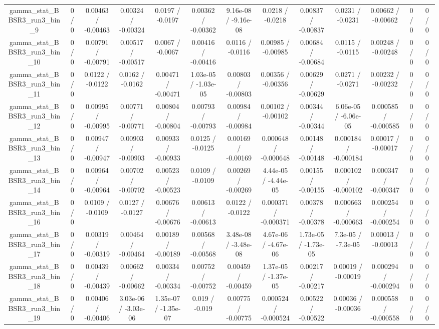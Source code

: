 \documentclass[10pt]{article}
\begin{document}
\begin{table}[htbp]
\begin{center}
\begin{tabular}{|c|c|c|c|c|c|c|c|c|c|c|c|c|}
  gamma_stat_BBSR3_run3_bin_9 & 0 / 0 & 0.00463 / -0.00463 & 0.00324 / -0.00324 & 0.0197 / -0.0197 & 0.00362 / -0.00362 & 9.16e-08 / -9.16e-08 & 0.0218 / -0.0218 & 0.00837 / -0.00837 & 0.0231 / -0.0231 & 0.00662 / -0.00662 & 0 / 0 & 0 / 0 \\ 
  gamma_stat_BBSR3_run3_bin_10 & 0 / 0 & 0.00791 / -0.00791 & 0.00517 / -0.00517 & 0.0067 / -0.0067 & 0.00416 / -0.00416 & 0.0116 / -0.0116 & 0.00985 / -0.00985 & 0.00684 / -0.00684 & 0.0115 / -0.0115 & 0.00248 / -0.00248 & 0 / 0 & 0 / 0 \\ 
  gamma_stat_BBSR3_run3_bin_11 & 0 / 0 & 0.0122 / -0.0122 & 0.0162 / -0.0162 & 0.00471 / -0.00471 & 1.03e-05 / -1.03e-05 & 0.00803 / -0.00803 & 0.00356 / -0.00356 & 0.00629 / -0.00629 & 0.0271 / -0.0271 & 0.00232 / -0.00232 & 0 / 0 & 0 / 0 \\ 
  gamma_stat_BBSR3_run3_bin_12 & 0 / 0 & 0.00995 / -0.00995 & 0.00771 / -0.00771 & 0.00804 / -0.00804 & 0.00793 / -0.00793 & 0.00984 / -0.00984 & 0.00102 / -0.00102 & 0.00344 / -0.00344 & 6.06e-05 / -6.06e-05 & 0.000585 / -0.000585 & 0 / 0 & 0 / 0 \\ 
  gamma_stat_BBSR3_run3_bin_13 & 0 / 0 & 0.00947 / -0.00947 & 0.00903 / -0.00903 & 0.00933 / -0.00933 & 0.0125 / -0.0125 & 0.00169 / -0.00169 & 0.000648 / -0.000648 & 0.00148 / -0.00148 & 0.000184 / -0.000184 & 0.00017 / -0.00017 & 0 / 0 & 0 / 0 \\ 
  gamma_stat_BBSR3_run3_bin_14 & 0 / 0 & 0.00964 / -0.00964 & 0.00702 / -0.00702 & 0.00523 / -0.00523 & 0.0109 / -0.0109 & 0.00269 / -0.00269 & 4.44e-05 / -4.44e-05 & 0.00155 / -0.00155 & 0.000102 / -0.000102 & 0.000347 / -0.000347 & 0 / 0 & 0 / 0 \\ 
  gamma_stat_BBSR3_run3_bin_16 & 0 / 0 & 0.0109 / -0.0109 & 0.0127 / -0.0127 & 0.00676 / -0.00676 & 0.00613 / -0.00613 & 0.0122 / -0.0122 & 0.000371 / -0.000371 & 0.00378 / -0.00378 & 0.000663 / -0.000663 & 0.000254 / -0.000254 & 0 / 0 & 0 / 0 \\ 
  gamma_stat_BBSR3_run3_bin_17 & 0 / 0 & 0.00319 / -0.00319 & 0.00464 / -0.00464 & 0.00189 / -0.00189 & 0.00568 / -0.00568 & 3.48e-08 / -3.48e-08 & 4.67e-06 / -4.67e-06 & 1.73e-05 / -1.73e-05 & 7.3e-05 / -7.3e-05 & 0.00013 / -0.00013 & 0 / 0 & 0 / 0 \\ 
  gamma_stat_BBSR3_run3_bin_18 & 0 / 0 & 0.00439 / -0.00439 & 0.00662 / -0.00662 & 0.00334 / -0.00334 & 0.00752 / -0.00752 & 0.00459 / -0.00459 & 1.37e-05 / -1.37e-05 & 0.00217 / -0.00217 & 0.00019 / -0.00019 & 0.000294 / -0.000294 & 0 / 0 & 0 / 0 \\ 
  gamma_stat_BBSR3_run3_bin_19 & 0 / 0 & 0.00406 / -0.00406 & 3.03e-06 / -3.03e-06 & 1.35e-07 / -1.35e-07 & 0.019 / -0.019 & 0.00775 / -0.00775 & 0.000524 / -0.000524 & 0.00522 / -0.00522 & 0.00036 / -0.00036 & 0.000558 / -0.000558 & 0 / 0 & 0 / 0 \\ 

\end{tabular}
\end{center}
\end{table}
\end{document}
